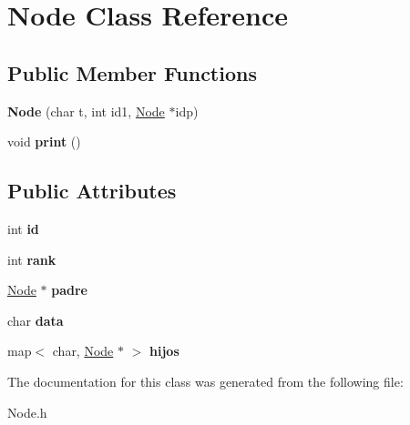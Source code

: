 \hypertarget{classNode}{
\section{Node Class Reference}
\label{classNode}
}
\subsection*{Public Member Functions}
\begin{DoxyCompactItemize}
\item 
\hypertarget{classNode_ac641778a0d6f83a7cc843053927076ed}{
{\bfseries Node} (char t, int id1, \hyperlink{classNode}{Node} $\ast$idp)}
\label{classNode_ac641778a0d6f83a7cc843053927076ed}

\item 
\hypertarget{classNode_a68513b404648b1cf7d53b568a590ab81}{
void {\bfseries print} ()}
\label{classNode_a68513b404648b1cf7d53b568a590ab81}

\end{DoxyCompactItemize}
\subsection*{Public Attributes}
\begin{DoxyCompactItemize}
\item 
\hypertarget{classNode_a59a543130a10c95f1e8642cf8c5645e8}{
int {\bfseries id}}
\label{classNode_a59a543130a10c95f1e8642cf8c5645e8}

\item 
\hypertarget{classNode_a085f5cff95f194f6e4a877915fecad0d}{
int {\bfseries rank}}
\label{classNode_a085f5cff95f194f6e4a877915fecad0d}

\item 
\hypertarget{classNode_adafaa513313c623da11803c2bea0fc38}{
\hyperlink{classNode}{Node} $\ast$ {\bfseries padre}}
\label{classNode_adafaa513313c623da11803c2bea0fc38}

\item 
\hypertarget{classNode_a94c9686e27f05bedd604d347d5bad449}{
char {\bfseries data}}
\label{classNode_a94c9686e27f05bedd604d347d5bad449}

\item 
\hypertarget{classNode_a1661c2c2729edb394fb0809b02fe3c31}{
map$<$ char, \hyperlink{classNode}{Node} $\ast$ $>$ {\bfseries hijos}}
\label{classNode_a1661c2c2729edb394fb0809b02fe3c31}

\end{DoxyCompactItemize}


The documentation for this class was generated from the following file:\begin{DoxyCompactItemize}
\item 
Node.h\end{DoxyCompactItemize}
